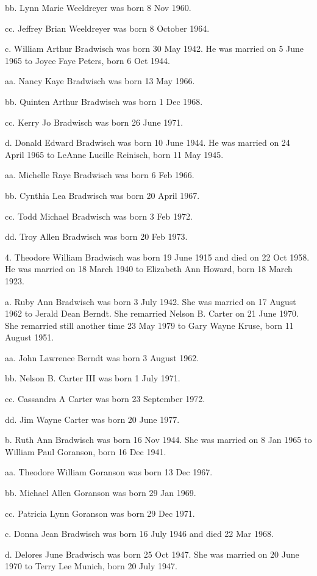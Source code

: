 \documentclass[a4paper]{article}
\begin{document}
bb. Lynn Marie Weeldreyer was born 8 Nov 1960.

cc. Jeffrey Brian Weeldreyer was born 8 October 1964.

c. William Arthur Bradwisch was born 30 May 1942.  He was married on 5 June 1965 to Joyce Faye Peters, born 6 Oct 1944.

aa. Nancy Kaye Bradwisch was born 13 May 1966.

bb. Quinten Arthur Bradwisch was born 1 Dec 1968.

cc. Kerry Jo Bradwisch was born 26 June 1971.

d. Donald Edward Bradwisch was born 10 June 1944.  He was married on 24 April 1965 to LeAnne Lucille Reinisch, born 11 May 1945.
 
aa. Michelle Raye Bradwisch was born 6 Feb 1966.

bb. Cynthia Lea Bradwisch was born 20 April 1967.

cc. Todd Michael Bradwisch was born 3 Feb 1972.

dd. Troy Allen Bradwisch was born 20 Feb 1973.

4. Theodore William Bradwisch was born 19 June 1915 and died on 22 Oct 1958. He was married on 18 March 1940 to Elizabeth Ann Howard, born 18 March 1923.

a. Ruby Ann Bradwisch was born 3 July 1942.  She was married on 17 August 1962 to Jerald Dean Berndt. She remarried Nelson B. Carter on 21 June 1970.  She remarried still another time 23 May 1979 to Gary Wayne Kruse, born 11 August 1951.  

aa. John Lawrence Berndt was born 3 August 1962.

bb. Nelson B. Carter III was born 1 July 1971.

cc. Cassandra A Carter was born 23 September 1972.

dd. Jim Wayne Carter was born 20 June 1977.

b. Ruth Ann Bradwisch was born 16 Nov 1944.  She was married on 8 Jan 1965 to William Paul Goranson, born 16 Dec 1941.
 
aa. Theodore William Goranson was born 13 Dec 1967.

bb. Michael Allen Goranson was born 29 Jan 1969.

cc. Patricia Lynn Goranson was born 29 Dec 1971.

c. Donna Jean Bradwisch was born 16 July 1946 and died 22 Mar 1968.

d. Delores June Bradwisch was born 25 Oct 1947.  She was married on 20 June 1970 to Terry Lee Munich, born 20 July 1947.
 
\end{document}
